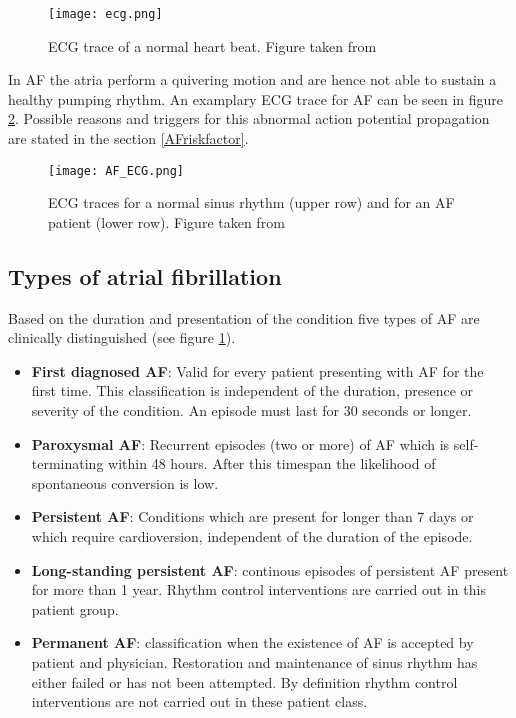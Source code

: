 \documentclass[type=dr, dr=rernat, accentcolor=tud7b,colorbacktitle, bigchapter, openright, twoside, 12pt ]{tudthesis}
\begin{document}
\newpage

\begin{figure}[H]
\begin{center}
\texttt{[image: ecg.png]}
\caption{ECG trace of a normal heart beat. Figure taken from \cite{afib}}
\label{ecg}
\end{center}
\end{figure}

In AF the atria perform a quivering motion and are hence not able to sustain a healthy pumping rhythm. An examplary ECG trace for AF 
can be seen in figure \ref{af_ecg}. 
Possible reasons and triggers for this abnormal action potential propagation are stated in the section \ref{AFriskfactor}.

\begin{figure}[H]
\begin{center}
\texttt{[image: AF\_ECG.png]}
\caption{ECG traces for a normal sinus rhythm (upper row) and for an AF patient (lower row). Figure taken from \cite{afib}}
\label{af_ecg}
\end{center}
\end{figure}

\newpage
\subsection{Types of atrial fibrillation}

Based on the duration and presentation of the condition five types of AF are clinically distinguished \cite{ESC10} \cite{CE09} (see figure 
\ref{ecg}).

\begin{itemize} 
 \item[] \textbf{First diagnosed AF}: Valid for every patient presenting with AF for the first time. This classification is independent of the 
 duration, presence or severity of the condition. An episode must last for 30 seconds or longer.
 \item[] \textbf{Paroxysmal AF}: Recurrent episodes (two or more) of AF which is self-terminating within 48 hours. After this timespan the 
 likelihood of spontaneous conversion is low.
 \item[] \textbf{Persistent AF}: Conditions which are present for longer than 7 days or which require cardioversion, independent of the 
 duration of the episode. 
 \item[] \textbf{Long-standing persistent AF}: continous episodes of persistent AF present for more than 1 year. Rhythm control 
 interventions  are carried out in this patient group. 
 \item[] \textbf{Permanent AF}: classification when the existence of AF is accepted by patient and physician. Restoration and maintenance
 of sinus rhythm has either failed or has not been attempted. By definition rhythm control interventions are not carried out in these 
 patient class.  
\end{itemize}
\end{document}
